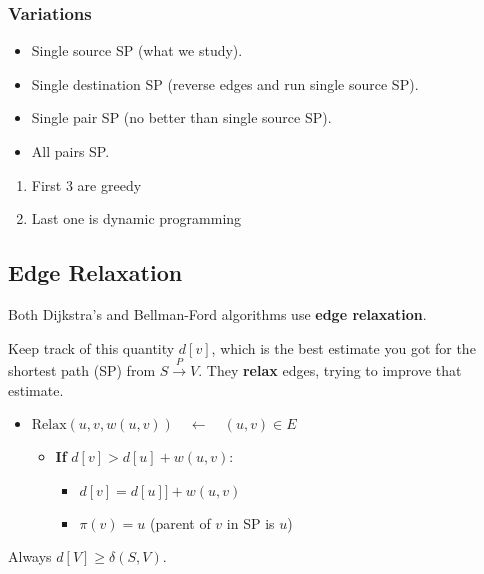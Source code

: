 \subsubsection{Variations}
\begin{definition}
    \begin{itemize}
        \item Single source SP (what we study).
        \item Single destination SP (reverse edges and run single source SP).
        \item Single pair SP (no better than single source SP).
        \item All pairs SP.
    \end{itemize}
    \begin{enumerate}
        \item First 3 are greedy 
        \item Last one is dynamic programming
    \end{enumerate}
\end{definition}

\subsection{Edge Relaxation}
\begin{definition}
    Both Dijkstra's and Bellman-Ford algorithms use \textbf{edge relaxation}.

    Keep track of this quantity \( d[v] \), which is the best estimate you got for the shortest path (SP) from \( S \overset{P}{\rightarrow} V \). They \textbf{relax} edges, trying to improve that estimate.

    \begin{itemize}
        \item $\text{Relax}(u, v, w(u, v)) \quad \leftarrow \quad (u, v) \in E$
        \begin{itemize}
            \item \textbf{If} \( d[v] > d[u] + w(u, v) \):
            \begin{itemize}
                \item \( d[v] = d[u]] + w(u, v) \)
                \item \( \pi(v) = u \) (parent of \( v \) in SP is \( u \))
            \end{itemize}
        \end{itemize}
    \end{itemize}
    
    Always \( d[V] \geq \delta(S, V) \).

    
\end{definition}

